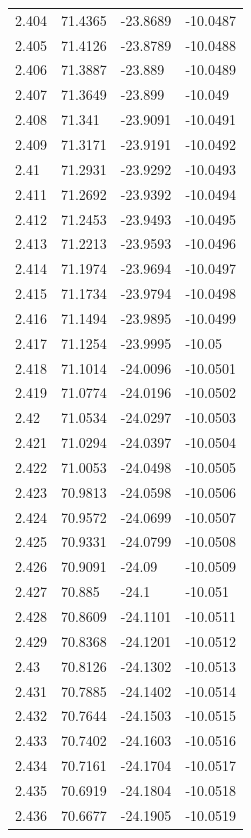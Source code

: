 \begin{tabular}{llll}
2.404 & 71.4365 & -23.8689 & -10.0487 \\
2.405 & 71.4126 & -23.8789 & -10.0488 \\
2.406 & 71.3887 & -23.889 & -10.0489 \\
2.407 & 71.3649 & -23.899 & -10.049 \\
2.408 & 71.341 & -23.9091 & -10.0491 \\
2.409 & 71.3171 & -23.9191 & -10.0492 \\
2.41 & 71.2931 & -23.9292 & -10.0493 \\
2.411 & 71.2692 & -23.9392 & -10.0494 \\
2.412 & 71.2453 & -23.9493 & -10.0495 \\
2.413 & 71.2213 & -23.9593 & -10.0496 \\
2.414 & 71.1974 & -23.9694 & -10.0497 \\
2.415 & 71.1734 & -23.9794 & -10.0498 \\
2.416 & 71.1494 & -23.9895 & -10.0499 \\
2.417 & 71.1254 & -23.9995 & -10.05 \\
2.418 & 71.1014 & -24.0096 & -10.0501 \\
2.419 & 71.0774 & -24.0196 & -10.0502 \\
2.42 & 71.0534 & -24.0297 & -10.0503 \\
2.421 & 71.0294 & -24.0397 & -10.0504 \\
2.422 & 71.0053 & -24.0498 & -10.0505 \\
2.423 & 70.9813 & -24.0598 & -10.0506 \\
2.424 & 70.9572 & -24.0699 & -10.0507 \\
2.425 & 70.9331 & -24.0799 & -10.0508 \\
2.426 & 70.9091 & -24.09 & -10.0509 \\
2.427 & 70.885 & -24.1 & -10.051 \\
2.428 & 70.8609 & -24.1101 & -10.0511 \\
2.429 & 70.8368 & -24.1201 & -10.0512 \\
2.43 & 70.8126 & -24.1302 & -10.0513 \\
2.431 & 70.7885 & -24.1402 & -10.0514 \\
2.432 & 70.7644 & -24.1503 & -10.0515 \\
2.433 & 70.7402 & -24.1603 & -10.0516 \\
2.434 & 70.7161 & -24.1704 & -10.0517 \\
2.435 & 70.6919 & -24.1804 & -10.0518 \\
2.436 & 70.6677 & -24.1905 & -10.0519 \\

\end{tabular}
